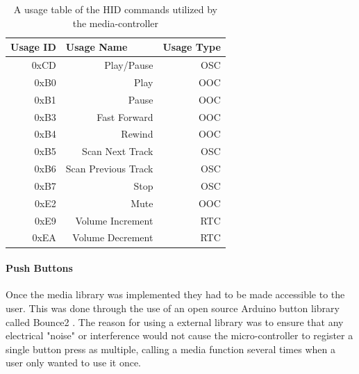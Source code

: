 \documentclass{article}
\begin{document}
			\begin{table}[]
				\centering
				\caption{A usage table of the HID commands utilized by the media-controller}
				\label{usageTable}
				\begin{tabular}{|r|r|r|}
					\hline
					\multicolumn{1}{|l|}{Usage ID} & \multicolumn{1}{l|}{Usage Name} & \multicolumn{1}{l|}{Usage Type} \\ \hline
					0xCD                           & Play/Pause                      & OSC                             \\
					0xB0                           & Play                            & OOC                             \\
					0xB1                           & Pause                           & OOC                             \\
					0xB3                           & Fast Forward                    & OOC                             \\
					0xB4                           & Rewind                          & OOC                             \\
					0xB5                           & Scan Next Track                 & OSC                             \\
					0xB6                           & Scan Previous Track             & OSC                             \\
					0xB7                           & Stop                            & OSC                             \\
					0xE2                           & Mute                            & OOC                             \\
					0xE9                           & Volume Increment                & RTC                             \\
					0xEA                           & Volume Decrement                & RTC                             \\ \hline
				\end{tabular}
			\end{table}
			
			\paragraph{Push Buttons}
			Once the media library was implemented they had to be made accessible to the user. This was done through the use of an open source Arduino button library called Bounce2 \cite{Bounce2Git:online}. The reason for using a external library was to ensure that any electrical "noise" or interference would not cause the micro-controller to register a single button press as multiple, calling a media function several times when a user only wanted to use it once.
			
\end{document}
